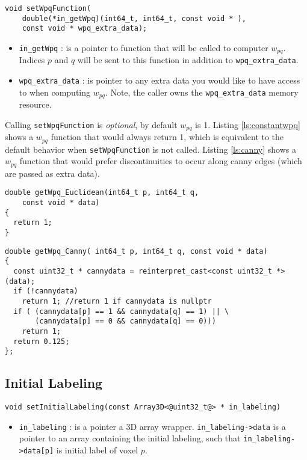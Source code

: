 \documentclass[12pt,letterpaper]{article}
\begin{document}
\begin{lstlisting}
void setWpqFunction(
    double(*in_getWpq)(int64_t, int64_t, const void * ),
    const void * wpq_extra_data);
\end{lstlisting}
\begin{itemize}
\item \lstinline{in_getWpq} : is a pointer to function that will be called to computer $w_{pq}$. Indices $p$ and $q$ will be sent to this function in addition to \lstinline{wpq_extra_data}.
\item \lstinline{wpq_extra_data} : is pointer to any extra data you would like to have access to when computing $w_{pq}.$ Note, the caller owns the \lstinline{wpq_extra_data} memory resource.
\end{itemize}
Calling \lstinline{setWpqFunction} is {\em optional}, by default $w_{pq}$ is 1. Listing \ref{ls:constantwpq} shows a $w_{pq}$ function that would always return 1, which is equivalent to the default behavior when \lstinline{setWpqFunction} is not called. Listing \ref{ls:canny} shows a $w_{pq}$ function that would prefer discontinuities to occur along canny edges (which are passed as extra data).

\begin{lstlisting}[caption=Constant $w_{pq}$,label={ls:constantwpq},backgroundcolor=\color{white},frame=single]
double getWpq_Euclidean(int64_t p, int64_t q,
    const void * data)
{
  return 1;
}
\end{lstlisting}

\begin{lstlisting}[caption=$w_{pq}$ as a function of Canny Edges,label={ls:canny},backgroundcolor=\color{white},frame=single]
double getWpq_Canny( int64_t p, int64_t q, const void * data)
{
  const uint32_t * cannydata = reinterpret_cast<const uint32_t *>(data);
  if (!cannydata)
    return 1; //return 1 if cannydata is nullptr
  if ( (cannydata[p] == 1 && cannydata[q] == 1) || \
       (cannydata[p] == 0 && cannydata[q] == 0)))
    return 1;
  return 0.125;
};
\end{lstlisting}

\subsection{Initial Labeling}
\begin{lstlisting}
void setInitialLabeling(const Array3D<@uint32_t@> * in_labeling)
\end{lstlisting}
\begin{itemize}
\item \lstinline{in_labeling} : is a pointer a 3D array wrapper. \lstinline{in_labeling->data} is a pointer to an array containing the initial labeling, such that \lstinline{in_labeling->data[p]} is initial label of voxel $p$.
\end{itemize}
\end{document}
